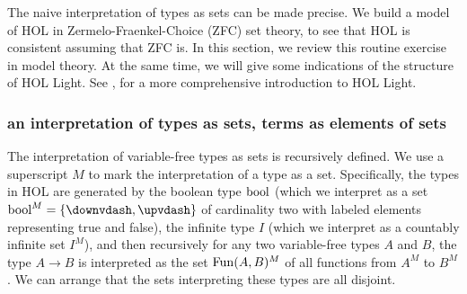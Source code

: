 \documentclass[brochure,english,12pt]{bourbaki}
\theoremstyle{plain}
\begin{document}
The naive interpretation of types as sets can be made precise.
We build a model of HOL in Zermelo-Fraenkel-Choice (ZFC) set theory, to see that HOL is consistent assuming that ZFC is.
In this section, we review this routine exercise in model theory.  
At the same time, we will give some indications of the structure of HOL Light.
See \cite{harrison2009hol}, for a more comprehensive introduction to HOL Light.



\subsubsection{an interpretation of types as sets, terms as elements of sets}

The interpretation
of variable-free types as sets is recursively defined.  We use a superscript $M$ to mark the interpretation
of a type as a set.  Specifically, the types in HOL are generated by
the boolean type ${\operatorname{bool}}$ (which we interpret as a set $\bool^M=\{\downvdash ,\upvdash \}$ 
of cardinality two with labeled elements representing true and false),
the infinite type $I$ (which we interpret as a countably infinite set $I^M$),
and then recursively for any two variable-free types $A$ and $B$, the type $A\to B$ is interpreted
as the set ${\operatorname{Fun}}(A,B)^M$ of all functions from $A^M$ to $B^M$.
We can arrange that the sets interpreting these types are all disjoint.

\end{document}
